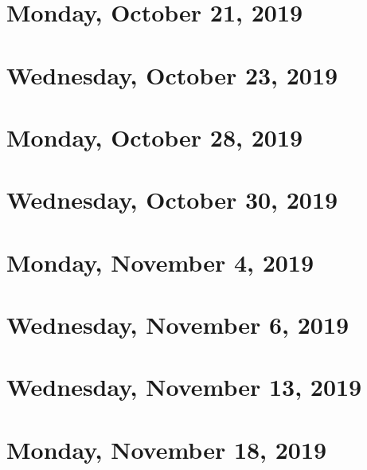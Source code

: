 \documentclass{../mynotes}
\begin{document}
\section{Monday, October 21, 2019}
    
\section{Wednesday, October 23, 2019}
    

\section{Monday, October 28, 2019}
    
\section{Wednesday, October 30, 2019}
    
    
\section{Monday, November 4, 2019}
    
\section{Wednesday, November 6, 2019}
    
    
\section{Wednesday, November 13, 2019}
    
    
\section{Monday, November 18, 2019}
    
\end{document}

